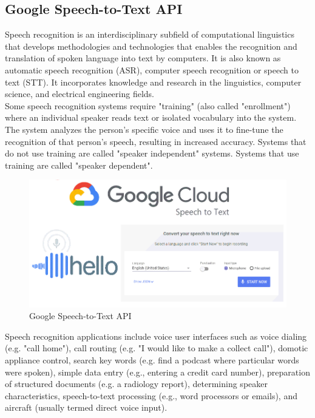 \documentclass[14pt]{report}
\begin{document}
			\subsection{Google Speech-to-Text API}
				Speech recognition is an interdisciplinary subfield of computational linguistics that develops methodologies and technologies that enables the recognition and translation of spoken language into text by computers. It is also known as automatic speech recognition (ASR), computer speech recognition or speech to text (STT). It incorporates knowledge and research in the linguistics, computer science, and electrical engineering fields.\\

				Some speech recognition systems require "training" (also called "enrollment") where an individual speaker reads text or isolated vocabulary into the system. The system analyzes the person's specific voice and uses it to fine-tune the recognition of that person's speech, resulting in increased accuracy. Systems that do not use training are called "speaker independent" systems. Systems that use training are called "speaker dependent".\\
				\begin{figure}[h]
					\includegraphics[width=14cm]{googlestt.png}
					\centering
					\caption{Google Speech-to-Text API}
				\end{figure}
				
				Speech recognition applications include voice user interfaces such as voice dialing (e.g. "call home"), call routing (e.g. "I would like to make a collect call"), domotic appliance control, search key words (e.g. find a podcast where particular words were spoken), simple data entry (e.g., entering a credit card number), preparation of structured documents (e.g. a radiology report), determining speaker characteristics, speech-to-text processing (e.g., word processors or emails), and aircraft (usually termed direct voice input).\\
\end{document}
